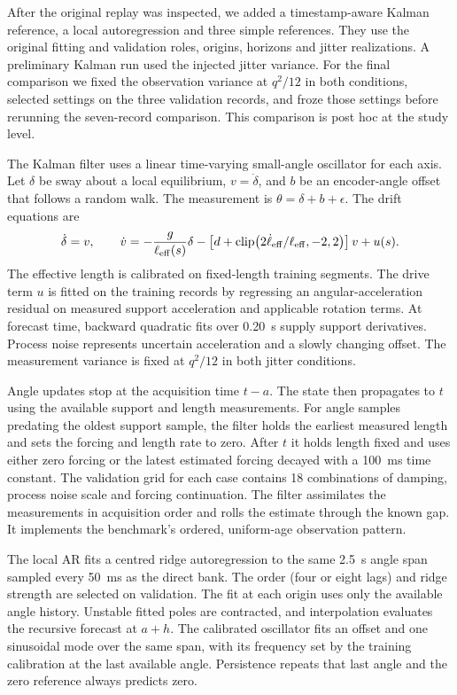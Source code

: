 After the original replay was inspected, we added a timestamp-aware Kalman reference, a local autoregression and three simple references. They use the original fitting and validation roles, origins, horizons and jitter realizations. A preliminary Kalman run used the injected jitter variance. For the final comparison we fixed the observation variance at $q^2/12$ in both conditions, selected settings on the three validation records, and froze those settings before rerunning the seven-record comparison. This comparison is post hoc at the study level.

The Kalman filter uses a linear time-varying small-angle oscillator for each axis. Let $\delta$ be sway about a local equilibrium, $v=\dot\delta$, and $b$ be an encoder-angle offset that follows a random walk. The measurement is $\theta=\delta+b+\epsilon$. The drift equations are
\begin{equation}
 \dot \delta=v,\qquad
 \dot v=-\frac{g}{\ell_{\rm eff}(s)}\delta
 -\left[d+\operatorname{clip}\!\left(2\dot\ell_{\rm eff}/\ell_{\rm eff},-2,2\right)\right]v+u(s).
\end{equation}
The effective length is calibrated on fixed-length training segments. The drive term $u$ is fitted on the training records by regressing an angular-acceleration residual on measured support acceleration and applicable rotation terms. At forecast time, backward quadratic fits over 0.20~s supply support derivatives. Process noise represents uncertain acceleration and a slowly changing offset. The measurement variance is fixed at $q^2/12$ in both jitter conditions.

Angle updates stop at the acquisition time $t-a$. The state then propagates to $t$ using the available support and length measurements. For angle samples predating the oldest support sample, the filter holds the earliest measured length and sets the forcing and length rate to zero. After $t$ it holds length fixed and uses either zero forcing or the latest estimated forcing decayed with a 100~ms time constant. The validation grid for each case contains 18 combinations of damping, process noise scale and forcing continuation. The filter assimilates the measurements in acquisition order and rolls the estimate through the known gap. It implements the benchmark's ordered, uniform-age observation pattern.

The local AR fits a centred ridge autoregression to the same 2.5~s angle span sampled every 50~ms as the direct bank. The order (four or eight lags) and ridge strength are selected on validation. The fit at each origin uses only the available angle history. Unstable fitted poles are contracted, and interpolation evaluates the recursive forecast at $a+h$. The calibrated oscillator fits an offset and one sinusoidal mode over the same span, with its frequency set by the training calibration at the last available angle. Persistence repeats that last angle and the zero reference always predicts zero.

